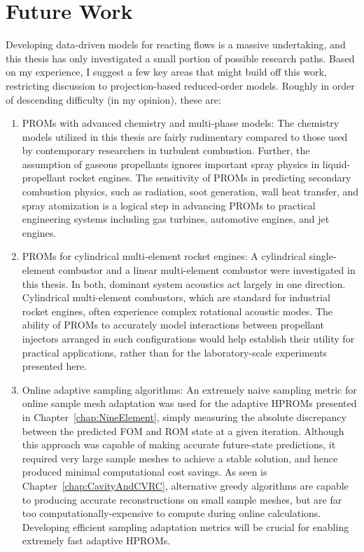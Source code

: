 \section{Future Work}

Developing data-driven models for reacting flows is a massive undertaking, and this thesis has only investigated a small portion of possible research paths. Based on my experience, I suggest a few key areas that might build off this work, restricting discussion to projection-based reduced-order models. Roughly in order of descending difficulty (in my opinion), these are:

\begin{enumerate}
    \item PROMs with advanced chemistry and multi-phase models: The chemistry models utilized in this thesis are fairly rudimentary compared to those used by contemporary researchers in turbulent combustion. Further, the assumption of gaseous propellants ignores important spray physics in liquid-propellant rocket engines. The sensitivity of PROMs in predicting secondary combustion physics, such as radiation, soot generation, wall heat transfer, and spray atomization is a logical step in advancing PROMs to practical engineering systems including gas turbines, automotive engines, and jet engines.
    \item PROMs for cylindrical multi-element rocket engines: A cylindrical single-element combustor and a linear multi-element combustor were investigated in this thesis. In both, dominant system acoustics act largely in one direction. Cylindrical multi-element combustors, which are standard for industrial rocket engines, often experience complex rotational acoustic modes. The ability of PROMs to accurately model interactions between propellant injectors arranged in such configurations would help establish their utility for practical applications, rather than for the laboratory-scale experiments presented here.
    \item Online adaptive sampling algorithms: An extremely naive sampling metric for online sample mesh adaptation was used for the adaptive HPROMs presented in Chapter~\ref{chap:NineElement}, simply measuring the absolute discrepancy between the predicted FOM and ROM state at a given iteration. Although this approach was capable of making accurate future-state predictions, it required very large sample meshes to achieve a stable solution, and hence produced minimal computational cost savings. As seen is Chapter~\ref{chap:CavityAndCVRC}, alternative greedy algorithms are capable to producing accurate reconstructions on small sample meshes, but are far too computationally-expensive to compute during online calculations. Developing efficient sampling adaptation metrics will be crucial for enabling extremely fast adaptive HPROMs.

\end{enumerate}
